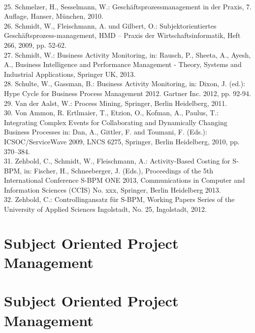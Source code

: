 \\
25.	Schmelzer, H., Sesselmann, W.: Geschäftsprozessmanagement in der Praxis, 7. Auflage, Hanser, München, 2010.
\\
26.	Schmidt, W., Fleischmann, A. und Gilbert, O.: Subjektorientiertes Geschäftsprozess-management, HMD – Praxis der Wirtschaftsinformatik, Heft 266, 2009, pp. 52-62.
\\
27.	Schmidt, W.: Business Activity Monitoring, in: Rausch, P., Sheeta, A., Ayesh, A., Business Intelligence and Performance Management - Theory, Systems and Industrial Applications, Springer UK, 2013.
\\
28.	Schulte, W., Gassman, B.: Business Activity Monitoring, in: Dixon, J. (ed.): Hype Cycle for Business Process Management 2012. Gartner Inc. 2012, pp. 92-94.
\\
29.	Van der Aalst, W.: Process Mining, Springer, Berlin Heidelberg, 2011.
\\
30.	Von Ammon, R. Ertlmaier, T., Etzion, O., Kofman, A., Paulus, T.: Integrating Complex Events for Collaborating and Dynamically Changing Business Processes in: Dan, A., Gittler, F. and Toumani, F. (Eds.): ICSOC/ServiceWave 2009, LNCS 6275, Springer, Berlin Heidelberg, 2010, pp. 370–384.
\\
31.	Zehbold, C., Schmidt, W., Fleischmann, A.: Activity-Based Costing for S-BPM, in: Fischer, H., Schneeberger, J. (Eds.), Proceedings of the 5th International Conference S-BPM ONE 2013, Communications in Computer and Information Sciences (CCIS) No. xxx, Springer, Berlin Heidelberg 2013.
\\
32.	Zehbold, C.: Controllingansatz für S-BPM, Working Papers Series of the University of Applied Sciences Ingolstadt, No. 25, Ingolstadt, 2012.


\section{Subject Oriented Project Management}

\section{Subject Oriented Project Management}

